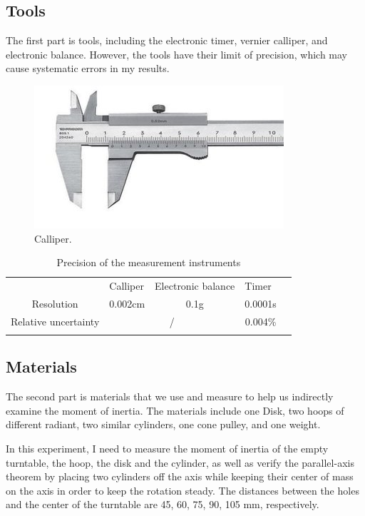 \documentclass[12pt]{article}
\begin{document}
\subsection{Tools} The first part is tools, including the electronic timer, vernier calliper, and electronic balance. However, the tools have their limit of precision, which may cause systematic errors in my results. 
\begin{figure}[H]
\centering
\includegraphics[width=0.7\linewidth]{Calliper.jpg}
\caption{\label{fig:Calliper}Calliper.}
\end{figure} 
\begin{table}[H]
\centering
\begin{tabular}{cllll}
\cline{1-4}
\multicolumn{1}{|r|}{\textbf{}} & \multicolumn{1}{l|}{Calliper} & \multicolumn{1}{l|}{Electronic balance} & \multicolumn{1}{l|}{Timer} &  \\ \cline{1-4}
\multicolumn{1}{|c|}{Resolution} & \multicolumn{1}{c|}{0.002cm} & \multicolumn{1}{c|}{0.1g} & \multicolumn{1}{c|}{0.0001s} &  \\ \cline{1-4}
\multicolumn{1}{|c|}{Relative uncertainty} & \multicolumn{2}{c|}{/} & \multicolumn{1}{c|}{0.004\%} &  \\ \cline{1-4}
\multicolumn{1}{l}{} &  &  &  & 
\end{tabular}
\caption{Precision of the measurement instruments}
\end{table}
\subsection{Materials}
The second part is materials that we use and measure to help us indirectly examine the moment of inertia. The materials include one Disk, two hoops of different radiant, two similar cylinders, one cone pulley, and one weight.
\par In this experiment, I need to measure the moment of inertia of the empty turntable, the hoop, the disk and the cylinder, as well as verify the parallel-axis theorem by placing two cylinders oﬀ the axis while keeping their center of mass on the axis in order to keep the rotation steady. The distances between the holes and the center of the turntable are 45, 60, 75, 90, 105 mm, respectively.
\end{document}
